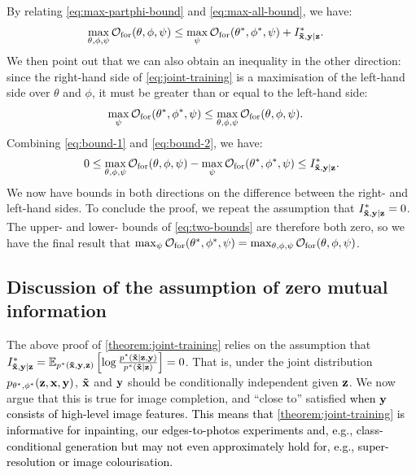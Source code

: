 By relating \cref{eq:max-partphi-bound} and \cref{eq:max-all-bound}, we have:
\begin{align}
  \max_{\theta, \phi, \psi } \mathcal{O}_\mathrm{for}(\theta, \phi, \psi ) &\leq  \max_{\psi } \mathcal{O}_\mathrm{for}({\theta}^*, {\phi}^*, \psi ) + I^*_{\mathbf{\tilde{x}}{},\mathbf{y}{}|\mathbf{z}{}}{}. \label{eq:bound-1}
\end{align}
We then point out that we can also obtain an inequality in the other direction: since
the right-hand side of \cref{eq:joint-training} is a maximisation of the left-hand side over $\theta$ and
$\phi$, it must be greater than or equal to the left-hand side:
\begin{align}
  \max_{\psi } \mathcal{O}_\mathrm{for}({\theta}^*, {\phi}^*, \psi ) &\leq  \max_{\theta, \phi, \psi } \mathcal{O}_\mathrm{for}(\theta, \phi, \psi )  . \label{eq:bound-2}
\end{align}
Combining \cref{eq:bound-1} and \cref{eq:bound-2}, we have:
\begin{align}
  0 \leq \max_{\theta, \phi, \psi } \mathcal{O}_\mathrm{for}(\theta, \phi, \psi ) - \max_{\psi } \mathcal{O}_\mathrm{for}({\theta}^*, {\phi}^*, \psi ) \leq I^*_{\mathbf{\tilde{x}}{},\mathbf{y}{}|\mathbf{z}{}}{}. \label{eq:two-bounds}
\end{align}
We now have bounds in both directions on the difference between the right- and
left-hand sides. To conclude the proof, we repeat the assumption that
$I^*_{\mathbf{\tilde{x}}{},\mathbf{y}{}|\mathbf{z}{}}{}=0$. The upper- and lower- bounds of \cref{eq:two-bounds} are
therefore both zero, so we have the final result that ${\max_{\psi }
\mathcal{O}_\mathrm{for}({\theta}^*, {\phi}^*, \psi ) =
\max_{\theta, \phi, \psi } \mathcal{O}_\mathrm{for}(\theta, \phi,
\psi )}$.

\subsection{Discussion of the assumption of zero mutual information}
The above proof of \cref{theorem:joint-training} relies on the assumption that
$I^*_{\mathbf{\tilde{x}}{},\mathbf{y}{}|\mathbf{z}{}}{} = \mathbb{E}_{{p}^*{}(\mathbf{\tilde{x}}{}, {\mathbf{y}}, {\mathbf{z}})} \left[ \log
  \frac{{p}^*{}(\mathbf{\tilde{x}}{}|{\mathbf{z}}, {\mathbf{y}}) }{ {p}^*{}(\mathbf{\tilde{x}}{}|{\mathbf{z}}) } \right] = 0$.
That is, under the joint distribution $p_{\theta^*,\phi^*}({\mathbf{z}},{\mathbf{x}},{\mathbf{y}})$, $\mathbf{\tilde{x}}{}$ and
${\mathbf{y}}$ should be conditionally independent given ${\mathbf{z}}$. We now argue that this
is true for image completion, and ``close to'' satisfied \textcolor{black}{when
  $\mathbf{y}$ consists of high-level image features. This means that
  \cref{theorem:joint-training} is informative for inpainting, our
  edges-to-photos experiments and, e.g., class-conditional generation but may
  not even approximately hold for, e.g., super-resolution or image
  colourisation.}

